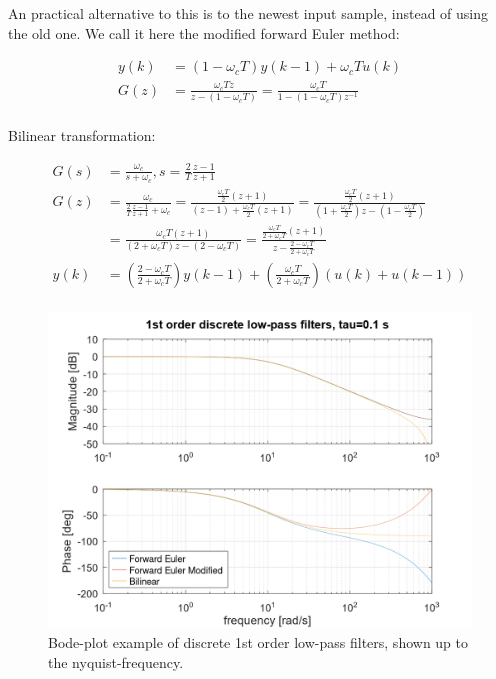 \documentclass[]{book}
\begin{document}
An practical alternative to this is to the newest input sample, instead of using the old one. We call it here the modified forward Euler method:

\[
\begin{aligned}
y(k) &= (1 - \omega_c T)y(k-1)   + \omega_c T u(k) \\
G(z) &=  \frac{\omega_c T z}{z- (1 - \omega_c T)} = \frac{\omega_c T }{1- (1 - \omega_c T)z^{-1}} \\
\end{aligned}
\label{eq:dlpf2}
\]

Bilinear transformation:

\[
\begin{aligned}
G(s) &=  \frac{\omega_c}{s + \omega_c}, s=\frac{2}{T} \frac{z-1}{z+1} \\
G(z) &=  \frac{\omega_c}{\frac{2}{T} \frac{z-1}{z+1} + \omega_c}
= \frac{ \frac{\omega_cT}{2}(z+1)}{ (z-1)+ \frac{\omega_cT}{2} (z+1)} 
= \frac{ \frac{\omega_cT}{2}(z+1)}{  (1+\frac{\omega_cT}{2}) z - (1-\frac{\omega_cT}{2})}  \\
 &=   \frac{ \omega_cT(z+1)}{  (2+\omega_cT) z - (2-\omega_cT)} 
 =  \frac{ \frac{\omega_cT}{2+\omega_cT}(z+1)}{   z - \frac{2-\omega_cT}{2+\omega_cT}}  \\
y(k) &=   \left( \frac{2-\omega_cT}{2+\omega_cT} \right) y(k-1)   + \left( \frac{\omega_cT}{2+\omega_cT} \right)  (u(k)+u(k-1)) \\
\end{aligned}
\label{eq:dlpf3}
\]

\begin{figure}
\includegraphics[width=0.8\linewidth]{images/filters/lpf_1st_disc} \caption{Bode-plot example of discrete 1st order low-pass filters, shown up to the nyquist-frequency.}\label{fig:unnamed-chunk-8}
\end{figure}
\end{document}
